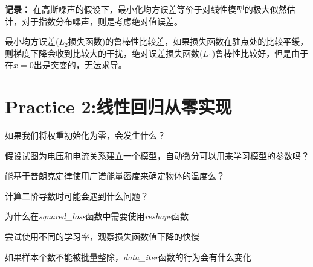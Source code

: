 \begin{mdframed}[backgroundcolor=gray!15]
    \textbf{记录：} 在高斯噪声的假设下，最小化均方误差等价于对线性模型的极大似然估计，对于指数分布噪声，则是考虑绝对值误差。

    最小均方误差($L_2$损失函数)的鲁棒性比较差，如果损失函数在驻点处的比较平缓，则梯度下降会收到比较大的干扰，绝对误差损失函数($L_1$)鲁棒性比较好，但是由于在$x=0$出是突变的，无法求导。
\end{mdframed}



\section{Practice 2:线性回归从零实现}

\begin{mdframed}
    \begin{question}
        如果我们将权重初始化为零，会发生什么？
    \end{question}
\end{mdframed}

\begin{mdframed}
    \begin{question}
        假设试图为电压和电流关系建立一个模型，自动微分可以用来学习模型的参数吗？
    \end{question}
\end{mdframed}

\begin{mdframed}
    \begin{question}
        能基于普朗克定律使用广谱能量密度来确定物体的温度么？
    \end{question}
\end{mdframed}

\begin{mdframed}
    \begin{question}
        计算二阶导数时可能会遇到什么问题？
    \end{question}
\end{mdframed}

\begin{mdframed}
    \begin{question}
        为什么在\textsl{squared\_loss}函数中需要使用\textsl{reshape}函数
    \end{question}
\end{mdframed}

\begin{mdframed}
    \begin{question}
        尝试使用不同的学习率，观察损失函数值下降的快慢
    \end{question}
\end{mdframed}

\begin{mdframed}
    \begin{question}
        如果样本个数不能被批量整除，\textsl{data\_iter}函数的行为会有什么变化
    \end{question}
\end{mdframed}